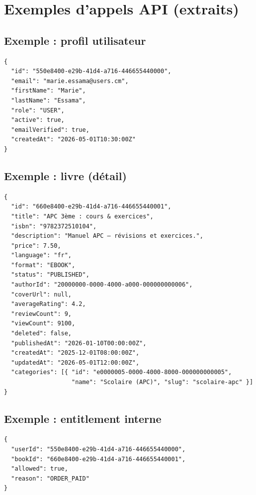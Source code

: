 \documentclass[12pt,a4paper]{report}
\begin{document}

\chapter{Exemples d'appels API (extraits)}
\section{Exemple : profil utilisateur}
\begin{lstlisting}[caption={GET /api/v1/auth/me (réponse)},label={lst:authme}]
{
  "id": "550e8400-e29b-41d4-a716-446655440000",
  "email": "marie.essama@users.cm",
  "firstName": "Marie",
  "lastName": "Essama",
  "role": "USER",
  "active": true,
  "emailVerified": true,
  "createdAt": "2026-05-01T10:30:00Z"
}
\end{lstlisting}

\section{Exemple : livre (détail)}
\begin{lstlisting}[caption={GET /api/v1/books/{id} (réponse)},label={lst:bookdetail}]
{
  "id": "660e8400-e29b-41d4-a716-446655440001",
  "title": "APC 3ème : cours & exercices",
  "isbn": "9782372510104",
  "description": "Manuel APC — révisions et exercices.",
  "price": 7.50,
  "language": "fr",
  "format": "EBOOK",
  "status": "PUBLISHED",
  "authorId": "20000000-0000-4000-a000-000000000006",
  "coverUrl": null,
  "averageRating": 4.2,
  "reviewCount": 9,
  "viewCount": 9100,
  "deleted": false,
  "publishedAt": "2026-01-10T00:00:00Z",
  "createdAt": "2025-12-01T08:00:00Z",
  "updatedAt": "2026-05-01T12:00:00Z",
  "categories": [{ "id": "e0000005-0000-4000-8000-000000000005",
                   "name": "Scolaire (APC)", "slug": "scolaire-apc" }]
}
\end{lstlisting}

\section{Exemple : entitlement interne}
\begin{lstlisting}[caption={GET /api/v1/internal/entitlements/users/\{userId\}/books/\{bookId\}},label={lst:entitlement}]
{
  "userId": "550e8400-e29b-41d4-a716-446655440000",
  "bookId": "660e8400-e29b-41d4-a716-446655440001",
  "allowed": true,
  "reason": "ORDER_PAID"
}
\end{lstlisting}
\end{document}
